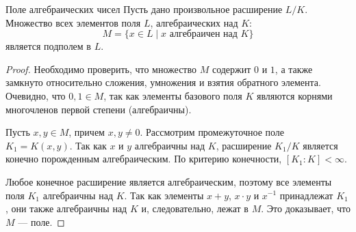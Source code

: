 \begin{Proposition}{Поле алгебраических чисел}{}
	Пусть дано произвольное расширение $L/K$. Множество всех элементов поля $L$, алгебраических над $K$:
	\[ M = \{ x \in L \mid x \text{ алгебраичен над } K \} \]
	является подполем в $L$.
\end{Proposition}

\begin{proof}
	Необходимо проверить, что множество $M$ содержит $0$ и $1$, а также замкнуто относительно сложения, умножения и взятия обратного элемента.
	Очевидно, что $0, 1 \in M$, так как элементы базового поля $K$ являются корнями многочленов первой степени (алгебраичны).

	Пусть $x, y \in M$, причем $x, y \neq 0$. Рассмотрим промежуточное поле $K_1 = K(x, y)$. Так как $x$ и $y$ алгебраичны над $K$, расширение $K_1/K$ является конечно порожденным алгебраическим.
	По критерию конечности, $[K_1:K] < \infty$.

	Любое конечное расширение является алгебраическим, поэтому все элементы поля $K_1$ алгебраичны над $K$. Так как элементы $x+y$, $x \cdot y$ и $x^{-1}$ принадлежат $K_1$, они также алгебраичны над $K$ и, следовательно, лежат в $M$.
	Это доказывает, что $M$ --- поле.
\end{proof}
